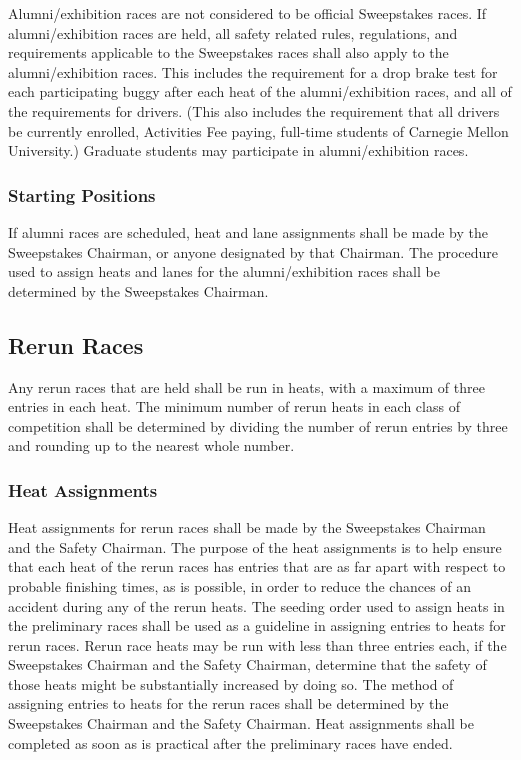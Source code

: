 	Alumni/exhibition races are not considered to be official Sweepstakes races. If alumni/exhibition races are held, all safety related rules, regulations, and requirements applicable to the Sweepstakes races shall also apply to the alumni/exhibition races. This includes the requirement for a drop brake test for each participating buggy after each heat of the alumni/exhibition races, and all of the requirements for drivers. (This also includes the requirement that all drivers be currently enrolled, Activities Fee paying, full-time students of Carnegie Mellon University.) Graduate students may participate in alumni/exhibition races.

\subsubsection{Starting Positions}

	If alumni races are scheduled, heat and lane assignments shall be made by the Sweepstakes Chairman, or anyone designated by that Chairman. The procedure used to assign heats and lanes for the alumni/exhibition races shall be determined by the Sweepstakes Chairman.

\subsection{Rerun Races}

	Any rerun races that are held shall be run in heats, with a maximum of three entries in each heat. The minimum number of rerun heats in each class of competition shall be determined by dividing the number of rerun entries by three and rounding up to the nearest whole number.

\subsubsection{Heat Assignments}

	Heat assignments for rerun races shall be made by the Sweepstakes Chairman and the Safety Chairman. The purpose of the heat assignments is to help ensure that each heat of the rerun races has entries that are as far apart with respect to probable finishing times, as is possible, in order to reduce the chances of an accident during any of the rerun heats. The seeding order used to assign heats in the preliminary races shall be used as a guideline in assigning entries to heats for rerun races. Rerun race heats may be run with less than three entries each, if the Sweepstakes Chairman and the Safety Chairman, determine that the safety of those heats might be substantially increased by doing so. The method of assigning entries to heats for the rerun races shall be determined by the Sweepstakes Chairman and the Safety Chairman. Heat assignments shall be completed as soon as is practical after the preliminary races have ended.

